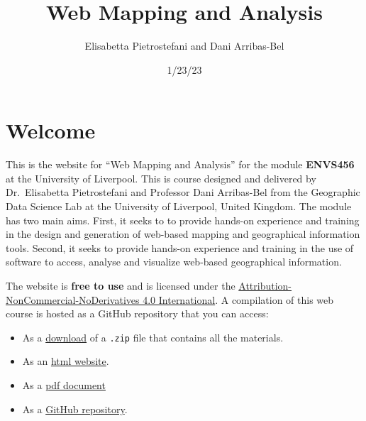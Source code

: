 \documentclass[
  letterpaper,
  DIV=11,
  numbers=noendperiod]{scrreprt}
\title{Web Mapping and Analysis}
\author{Elisabetta Pietrostefani and Dani Arribas-Bel}
\date{1/23/23}
\providecommand{\tightlist}{%
  \setlength{\itemsep}{0pt}\setlength{\parskip}{0pt}}\usepackage{longtable,booktabs,array}
\renewcommand*\contentsname{Table of contents}
\newcommand\contentsname{Table of contents}
\begin{document}
\maketitle
\ifdefined\Shaded\renewenvironment{Shaded}{\begin{tcolorbox}[sharp corners, interior hidden, boxrule=0pt, frame hidden, borderline west={3pt}{0pt}{shadecolor}, enhanced, breakable]}{\end{tcolorbox}}\fi

\renewcommand*\contentsname{Table of contents}
{
\hypersetup{linkcolor=}
\setcounter{tocdepth}{2}
\tableofcontents
}

\hypertarget{welcome}{%
\chapter*{Welcome}\label{welcome}}


This is the website for ``Web Mapping and Analysis'' for the module
\textbf{ENVS456} at the University of Liverpool. This is course designed
and delivered by Dr.~Elisabetta Pietrostefani and Professor Dani
Arribas-Bel from the Geographic Data Science Lab at the University of
Liverpool, United Kingdom. The module has two main aims. First, it seeks
to to provide hands-on experience and training in the design and
generation of web-based mapping and geographical information tools.
Second, it seeks to provide hands-on experience and training in the use
of software to access, analyse and visualize web-based geographical
information.

The website is \textbf{free to use} and is licensed under the
\href{https://creativecommons.org/licenses/by-nc-nd/4.0/}{Attribution-NonCommercial-NoDerivatives
4.0 International}. A compilation of this web course is hosted as a
GitHub repository that you can access:

\begin{itemize}
\tightlist
\item
  As a
  \href{https://github.com/GDSL-UL/wma/archive/refs/heads/main.zip}{download}
  of a \texttt{.zip} file that contains all the materials.
\item
  As an \href{https://gdsl-ul.github.io/wma}{html website}.
\item
  As a \href{https://gdsl-ul.github.io/wma.pdf}{pdf document}
\item
  As a \href{https://github.com/GDSL-UL/wma}{GitHub repository}.
\end{itemize}
\end{document}
